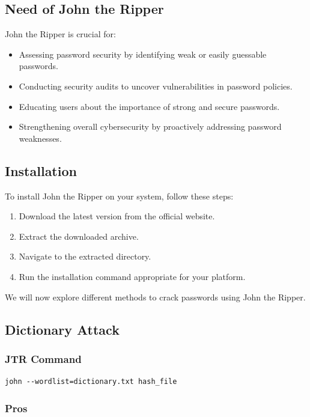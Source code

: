 \documentclass[11pt]{article}
\begin{document}
\subsection{Need of John the Ripper}
John the Ripper is crucial for:
\begin{itemize}
    \item Assessing password security by identifying weak or easily guessable passwords.
    \item Conducting security audits to uncover vulnerabilities in password policies.
    \item Educating users about the importance of strong and secure passwords.
    \item Strengthening overall cybersecurity by proactively addressing password weaknesses.
\end{itemize}

\subsection{Installation}
To install John the Ripper on your system, follow these steps:
\begin{enumerate}
    \item Download the latest version from the official website.
    \item Extract the downloaded archive.
    \item Navigate to the extracted directory.
    \item Run the installation command appropriate for your platform.
\end{enumerate}

We will now explore different methods to crack passwords using John the Ripper.
\subsection{Dictionary Attack}

\subsubsection{JTR Command}

\begin{verbatim}
john --wordlist=dictionary.txt hash_file
\end{verbatim}

\subsubsection{Pros}
\end{document}
